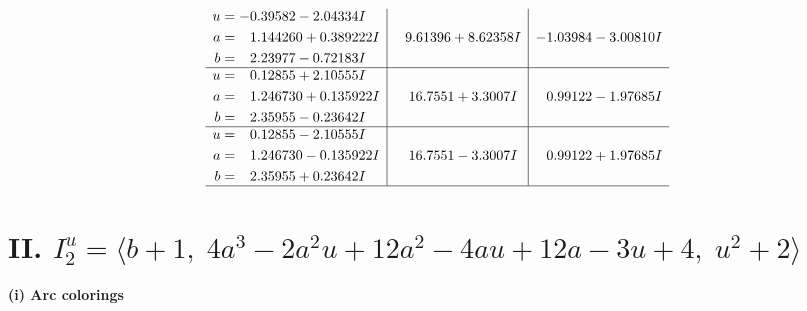 \documentclass[1p]{elsarticle_modified}
\theoremstyle{definition}
\begin{document}
$$\begin{array}{c|c|c}
\begin{aligned}
u &= -0.39582 - 2.04334 I \\
a &= \phantom{-}1.144260 + 0.389222 I \\
b &= \phantom{-}2.23977 - 0.72183 I\end{aligned}
 & \phantom{-}9.61396 + 8.62358 I & -1.03984 - 3.00810 I \\ \hline\begin{aligned}
u &= \phantom{-}0.12855 + 2.10555 I \\
a &= \phantom{-}1.246730 + 0.135922 I \\
b &= \phantom{-}2.35955 - 0.23642 I\end{aligned}
 & \phantom{-}16.7551 + 3.3007 I & \phantom{-}0.99122 - 1.97685 I \\ \hline\begin{aligned}
u &= \phantom{-}0.12855 - 2.10555 I \\
a &= \phantom{-}1.246730 - 0.135922 I \\
b &= \phantom{-}2.35955 + 0.23642 I\end{aligned}
 & \phantom{-}16.7551 - 3.3007 I & \phantom{-}0.99122 + 1.97685 I\\
 \hline 
 \end{array}$$\newpage\newpage\renewcommand{\arraystretch}{1}
\centering \section*{II. $I^u_{2}= \langle b+1,\;4 a^3-2 a^2 u+12 a^2-4 a u+12 a-3 u+4,\;u^2+2 \rangle$}
\flushleft \textbf{(i) Arc colorings}\\
\end{document}
